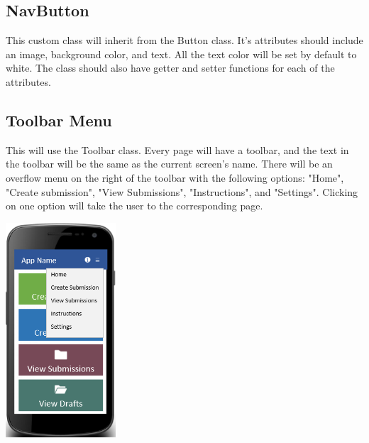 \documentclass[onecolumn, draftclsnofoot,10pt, compsoc]{IEEEtran}
\begin{document}
\subsection{NavButton}
This custom class will inherit from the Button class. It's attributes should include an image, background color, and text. All the text color will be set by default to white. The class should also have getter and setter functions for each of the attributes.

\subsection{Toolbar Menu}
This will use the Toolbar class. Every page will have a toolbar, and the text in the toolbar will be the same as the current screen's name. There will be an overflow menu on the right of the toolbar with the following options: "Home", "Create submission", "View Submissions", "Instructions", and "Settings". Clicking on one option will take the user to the corresponding page. 
\newline
\begin{center}
\includegraphics[height=8cm]{menuscreen.png}
\end{center}
\end{document}
